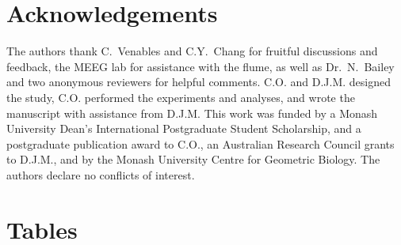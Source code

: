 \documentclass{article}
\begin{document}
\section{Acknowledgements}
The authors thank C.~Venables and C.Y.~Chang for fruitful discussions and feedback, the MEEG lab for assistance with the flume, as well as Dr.~N.~Bailey and two anonymous reviewers for helpful comments. C.O. and D.J.M. designed the study, C.O. performed the experiments and analyses, and wrote the manuscript with assistance from D.J.M. This work was funded by a Monash University Dean's International Postgraduate Student Scholarship, and a postgraduate publication award to C.O., an Australian Research Council grants to D.J.M., and by the Monash University Centre for Geometric Biology. The authors declare no conflicts of interest.

\newpage{}



	 \section{Tables}
	 \renewcommand{\thetable}{\arabic{table}}
	 \setcounter{table}{0}
\end{document}
